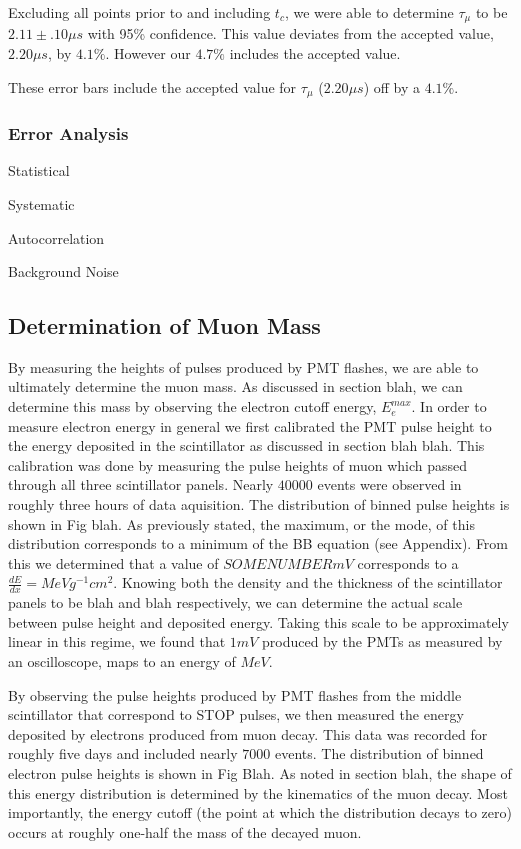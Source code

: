 Excluding all points prior to and including $t_{c}$, we were able to determine $\tau_{\mu}$ to be $2.11 \pm .10 \mu s$ with 95\% confidence.  This value deviates from the accepted value, $2.20\mu s$, by $4.1\%$.  However our $4.7\%$ includes the accepted value.

These error bars include the accepted value for $\tau_{\mu}$ ($2.20\mu s$) off by a $4.1\%$.

\subsubsection{Error Analysis}

Statistical

Systematic

Autocorrelation

Background Noise

\subsection{Determination of Muon Mass}

By measuring the heights of pulses produced by PMT flashes, we are able to ultimately determine the muon mass.  As discussed in section blah, we can determine this mass by observing the electron cutoff energy, $E_{e}^{max}$. In order to measure electron energy in general we first calibrated the PMT pulse height to the energy deposited in the scintillator as discussed in section blah blah. This calibration was done by measuring the pulse heights of muon which passed through all three scintillator panels.  Nearly $40000$ events were observed in roughly three hours of data aquisition.  The distribution of binned pulse heights is shown in Fig blah.  As previously stated, the maximum, or the mode, of this distribution corresponds to a minimum of the BB equation (see Appendix).  From this we determined that a value of $SOME NUMBER mV$ corresponds to a $\frac{dE}{dx}= MeV g^{-1} cm^{2}$.  Knowing both the density and the thickness of the scintillator panels to be blah and blah respectively, we can determine the actual scale between pulse height and deposited energy.  Taking this scale to be approximately linear in this regime, we found that $1mV$ produced by the PMTs as measured by an oscilloscope, maps to an energy of $MeV$. 

By observing the pulse heights produced by PMT flashes from the middle scintillator that correspond to STOP pulses, we then measured the energy deposited by electrons produced from muon decay.  This data was recorded for roughly five days and included nearly $7000$ events.  The distribution of binned electron pulse heights is shown in Fig Blah.  As noted in section blah, the shape of this energy distribution is determined by the kinematics of the muon decay.  Most importantly, the energy cutoff (the point at which the distribution decays to zero) occurs at roughly one-half the mass of the decayed muon.

